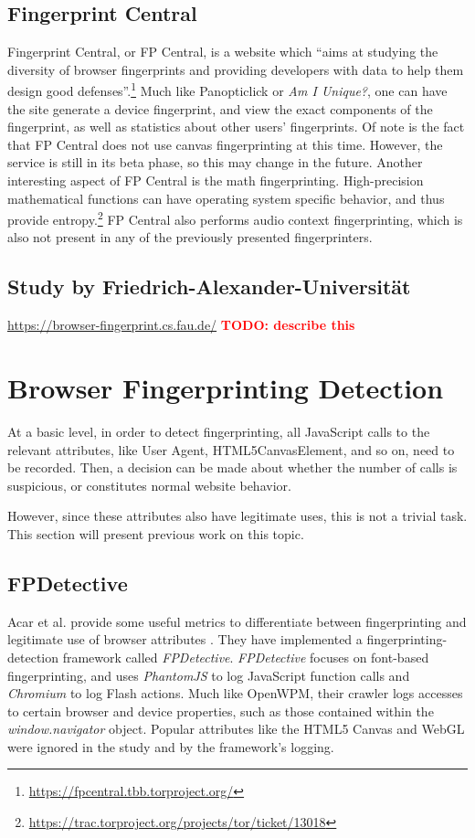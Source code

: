 \documentclass[
    fontsize=12pt,
    headings=small,
    parskip=half,
    bibliography=totoc,
    numbers=noenddot,
    open=any
    ]{scrreprt}
\newcommand{\todo}[1]{\textcolor{red}{\textbf{TODO: #1}}}
\begin{document}
\subsection{Fingerprint Central}
\label{related_work:fp_central}
Fingerprint Central, or FP Central, is a website which ``aims at studying the diversity
of browser fingerprints and providing developers with data to help them design good defenses''.\footnote{\url{https://fpcentral.tbb.torproject.org/}}
Much like Panopticlick or \textit{Am I Unique?}, one can have the site generate a device fingerprint,
and view the exact components of the fingerprint, as well as statistics about other users' fingerprints.
Of note is the fact that FP Central does not use canvas fingerprinting at this time.
However, the service is still in its beta phase, so this may change in the future.
Another interesting aspect of FP Central is the math fingerprinting.
High-precision mathematical functions can have operating system specific behavior, and thus provide
entropy.\footnote{\url{https://trac.torproject.org/projects/tor/ticket/13018}}
FP Central also performs audio context fingerprinting, which is also not present in any of the previously presented
fingerprinters.

\subsection{Study by Friedrich-Alexander-Universität}
\url{https://browser-fingerprint.cs.fau.de/}
\todo{describe this}

\section{Browser Fingerprinting Detection}
At a basic level, in order to detect fingerprinting, all JavaScript calls to the relevant attributes,
like User Agent, HTML5CanvasElement, and so on, need to be recorded. Then, a decision can be made about whether the number
of calls is suspicious, or constitutes normal website behavior.

However, since these attributes also have legitimate uses, this is not a trivial task.
This section will present previous work on this topic.


\subsection{FPDetective}
\label{related_work:fpdetective}
Acar et al. provide some useful metrics to differentiate between fingerprinting and legitimate use of
browser attributes \cite{DBLP:conf/ccs/AcarJNDGPP13}. They have implemented a fingerprinting-detection
framework called \textit{FPDetective}.
\textit{FPDetective} focuses on font-based fingerprinting, and uses
\textit{PhantomJS} to log JavaScript function calls and \textit{Chromium} to log Flash actions.
Much like OpenWPM, their crawler logs accesses to certain browser and device properties, such as
those contained within the \textit{window.navigator} object.
Popular attributes like the HTML5 Canvas and WebGL were ignored in the study and by the framework's logging.
\end{document}

